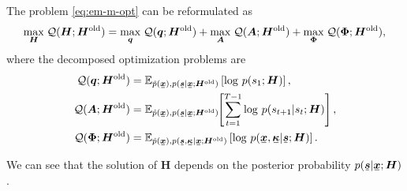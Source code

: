 The problem \eqref{eq:em-m-opt} can be reformulated as
\begin{align}\label{eq:m-step-subs}
  \underset{\bm{H}}{\max}\; \mathcal{Q}(\bm{H}; \bm{H}^{\mathrm{old}})
  =\underset{\bm{q}}{\max}\;\mathcal{Q}(\bm{q}; \bm{H}^{\mathrm{old}}) + \underset{\bm{A}}{\max}\;\mathcal{Q}(\bm{A}; \bm{H}^{\mathrm{old}}) 
     + \underset{\bm{\Phi}}{\max}\;\mathcal{Q}(\bm{\Phi}; \bm{H}^{\mathrm{old}}),
\end{align}
where the decomposed optimization problems are
\begin{align}
  \Qq(\bm{q}; \bm{H}^{\mathrm{old}}) 
    &= \EE_{\hat{p}(\ubm{x}),p(\ubm{s}| \ubm{x}; \bm{H}^{\mathrm{old}})} \left[ \log\,p({s}_{1};\bm{H})  \right], \label{eq:init-distribution-update}\\
  \Qq(\bm{A}; \bm{H}^{\mathrm{old}}) &=\EE_{\hat{p}(\ubm{x}),p(\ubm{s}| \ubm{x}; \bm{H}^{\mathrm{old}})}\hspace{-0.1cm}\left[ \sum_{t=1}^{T-1}\log\,p({s}_{t+1}|{s}_{t}; \bm{H}) \right], \label{eq:transition-update}\\
  \Qq(\bm{\Phi}; \bm{H}^{\mathrm{old}}) &= \EE_{\hat{p}(\ubm{x}),p(\ubm{s},\ubm{\kappa}| \ubm{x}; \bm{H}^{\mathrm{old}})} \left[ \log\,p(\ubm{x}, \ubm{\kappa}| \ubm{s}; \bm{H}) \right]. \label{eq:generative-model-update}
\end{align}

We can see that the solution of $\bm{H}$ depends on the posterior probability $p(\ubm{s}| \ubm{x}; \bm{H})$.


